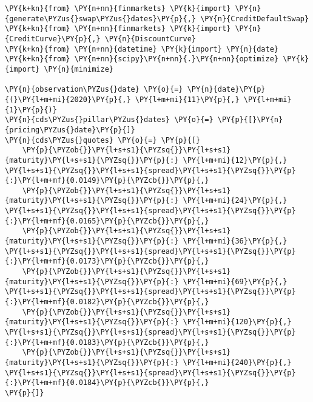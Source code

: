 \begin{Answer}
\begin{tcolorbox}[size=fbox, boxrule=1pt, pad at break*=1mm,colback=cellbackground, colframe=cellborder]
\begin{Verbatim}[commandchars=\\\{\}]
\PY{k+kn}{from} \PY{n+nn}{finmarkets} \PY{k}{import} \PY{n}{generate\PYZus{}swap\PYZus{}dates}\PY{p}{,} \PY{n}{CreditDefaultSwap}
\PY{k+kn}{from} \PY{n+nn}{finmarkets} \PY{k}{import} \PY{n}{CreditCurve}\PY{p}{,} \PY{n}{DiscountCurve}
\PY{k+kn}{from} \PY{n+nn}{datetime} \PY{k}{import} \PY{n}{date}
\PY{k+kn}{from} \PY{n+nn}{scipy}\PY{n+nn}{.}\PY{n+nn}{optimize} \PY{k}{import} \PY{n}{minimize}

\PY{n}{observation\PYZus{}date} \PY{o}{=} \PY{n}{date}\PY{p}{(}\PY{l+m+mi}{2020}\PY{p}{,} \PY{l+m+mi}{11}\PY{p}{,} \PY{l+m+mi}{1}\PY{p}{)}
\PY{n}{cds\PYZus{}pillar\PYZus{}dates} \PY{o}{=} \PY{p}{[}\PY{n}{pricing\PYZus{}date}\PY{p}{]}
\PY{n}{cds\PYZus{}quotes} \PY{o}{=} \PY{p}{[}
    \PY{p}{\PYZob{}}\PY{l+s+s1}{\PYZsq{}}\PY{l+s+s1}{maturity}\PY{l+s+s1}{\PYZsq{}}\PY{p}{:} \PY{l+m+mi}{12}\PY{p}{,} \PY{l+s+s1}{\PYZsq{}}\PY{l+s+s1}{spread}\PY{l+s+s1}{\PYZsq{}}\PY{p}{:}\PY{l+m+mf}{0.0149}\PY{p}{\PYZcb{}}\PY{p}{,}
    \PY{p}{\PYZob{}}\PY{l+s+s1}{\PYZsq{}}\PY{l+s+s1}{maturity}\PY{l+s+s1}{\PYZsq{}}\PY{p}{:} \PY{l+m+mi}{24}\PY{p}{,} \PY{l+s+s1}{\PYZsq{}}\PY{l+s+s1}{spread}\PY{l+s+s1}{\PYZsq{}}\PY{p}{:}\PY{l+m+mf}{0.0165}\PY{p}{\PYZcb{}}\PY{p}{,}
    \PY{p}{\PYZob{}}\PY{l+s+s1}{\PYZsq{}}\PY{l+s+s1}{maturity}\PY{l+s+s1}{\PYZsq{}}\PY{p}{:} \PY{l+m+mi}{36}\PY{p}{,} \PY{l+s+s1}{\PYZsq{}}\PY{l+s+s1}{spread}\PY{l+s+s1}{\PYZsq{}}\PY{p}{:}\PY{l+m+mf}{0.0173}\PY{p}{\PYZcb{}}\PY{p}{,}
    \PY{p}{\PYZob{}}\PY{l+s+s1}{\PYZsq{}}\PY{l+s+s1}{maturity}\PY{l+s+s1}{\PYZsq{}}\PY{p}{:} \PY{l+m+mi}{69}\PY{p}{,} \PY{l+s+s1}{\PYZsq{}}\PY{l+s+s1}{spread}\PY{l+s+s1}{\PYZsq{}}\PY{p}{:}\PY{l+m+mf}{0.0182}\PY{p}{\PYZcb{}}\PY{p}{,}
    \PY{p}{\PYZob{}}\PY{l+s+s1}{\PYZsq{}}\PY{l+s+s1}{maturity}\PY{l+s+s1}{\PYZsq{}}\PY{p}{:} \PY{l+m+mi}{120}\PY{p}{,} \PY{l+s+s1}{\PYZsq{}}\PY{l+s+s1}{spread}\PY{l+s+s1}{\PYZsq{}}\PY{p}{:}\PY{l+m+mf}{0.0183}\PY{p}{\PYZcb{}}\PY{p}{,}
    \PY{p}{\PYZob{}}\PY{l+s+s1}{\PYZsq{}}\PY{l+s+s1}{maturity}\PY{l+s+s1}{\PYZsq{}}\PY{p}{:} \PY{l+m+mi}{240}\PY{p}{,} \PY{l+s+s1}{\PYZsq{}}\PY{l+s+s1}{spread}\PY{l+s+s1}{\PYZsq{}}\PY{p}{:}\PY{l+m+mf}{0.0184}\PY{p}{\PYZcb{}}\PY{p}{,}
\PY{p}{]}


\end{Verbatim}
\end{tcolorbox}
\end{Answer}
